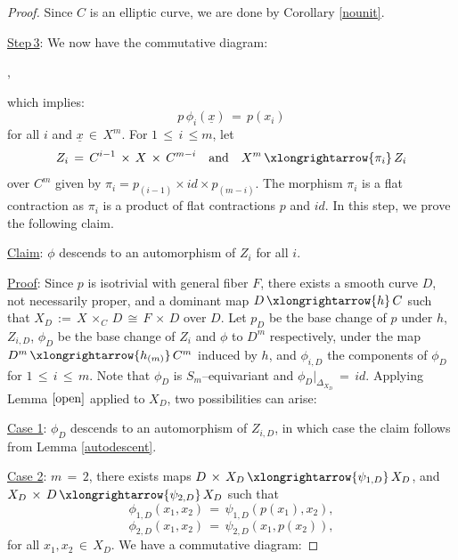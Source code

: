 \documentclass[12pt,reqno]{amsart}
\theoremstyle{definition}
\numberwithin{equation}{section}
\begin{document}
\begin{proof}
Since $C$ is an elliptic curve, we are done by Corollary \ref{nounit}.   

\underline{Step\,3}: We now have the commutative diagram:


\begin{center}
,
\end{center}
which implies:
\begin{equation}\label{commutativity}
p\,\phi_{i}(\underline{x})\,=\, p(x_{i})    
\end{equation}
for all $i$ and $\underline{x}\,\in\, X^{m}$. For $1\,\leq\,i\,\leq m$, let
$$Z_{i}\,=\, C^{i-1}\,\times\,X\,\times \, C^{m-i} \quad \text{and}\quad X^{m}\,\xlongrightarrow{\pi_i}\, Z_{i}$$ over $C^{m}$ given by $\pi_{i}=p_{(i-1)}\times id \times p_{(m-i)}$. The morphism $\pi_{i}$ is a flat contraction as $\pi_{i}$ is a product of flat contractions $p$ and $id$. In this step, we prove the following claim.  

\noindent\underline{Claim}:  $\phi$ descends to an automorphism of $Z_{i}$ for all $i$.

\noindent\underline{Proof}: Since $p$ is isotrivial with general fiber $F$, there exists a smooth curve $D$, not necessarily proper, and a dominant map $D\,\xlongrightarrow{h}\,C$ such that $X_{D}\,:=\, X\,\times_{C}\,D\,\cong\,F\,\times\, D$ over $D$. Let $p_D$ be the base change of $p$ under $h$, $Z_{i, D}$, $\phi_{D}$ be the base change of $Z_{i}$ and $\phi$ to $D^{m}$ respectively, under the map $D^{m}\,\xlongrightarrow{h_{(m)}}\, C^{m}$ induced by $h$, and $\phi_{i,D}$ the components of $\phi_D$ for $1\,\leq\, i\,\leq\, m$. Note that $\phi_{D}$ is $S_m$--equivariant and $\phi_{D}|_{\Delta_{X_{D}}}\,=\, {id}$. Applying Lemma $\ref{open}$ applied to $X_{D}$, two possibilities can arise:

\underline{Case 1}: $\phi_{D}$ descends to an automorphism of $Z_{i,D}$, in which case the claim follows from Lemma \ref{autodescent}.

\underline{Case 2}: $m\,=\, 2$, there exists maps $D\,\times\, X_{D}\,\xlongrightarrow{\psi_{1,D}}\, X_{D}$, and $X_{D}\,\times\,D\,\xlongrightarrow{\psi_{{2},D}}\,X_{D}$ such that 
\begin{equation*}
\phi_{1,D}(x_{1}, x_{2})\,=\, \psi_{1,D}(p(x_{1}), x_{2}),    
\end{equation*}
\begin{equation*}
\phi_{2,D}(x_{1},x_{2})\,=\, \psi_{2,D}(x_{1}, p(x_{2})),    
\end{equation*}
for all $x_{1},x_{2}\,\in\,X_{D}$.
We have a commutative diagram:


\end{proof}
\end{document}
